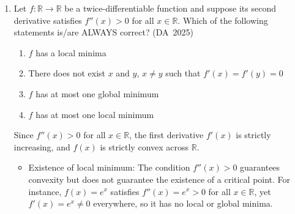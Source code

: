\begin{enumerate}[label=\thesubsection.\arabic*, ref=\thesubsection.\theenumi]
Specifically:
\begin{itemize}
	\item For any $\vec{x}_k$ ($k \in \{1, \dots, 5\}$):
	\begin{align}
		\vec{A}\vec{x}_k = \sum_{i=1}^5 \vec{x}_i \brak{\vec{x}_i^{\top}\vec{x}_k} = \vec{x}_k \brak{1} = 1\cdot\vec{x}_k \implies \lambda = 1 \quad (\text{multiplicity } 5)
	\end{align}
	\item For any orthogonal vector $\vec{y} \perp \text{span}\cbrak{\vec{x}_1, \dots, \vec{x}_5}$:
	\begin{align}
		\vec{A}\vec{y} = \sum_{i=1}^5 \vec{x}_i \brak{\vec{x}_i^{\top}\vec{y}} = \vec{0} = 0\cdot\vec{y} \implies \lambda = 0 \quad (\text{multiplicity } 5)
	\end{align}
\end{itemize}
Since $\vec{A}$ is real, symmetric, and positive semi-definite ($\lambda_i \ge 0$), its singular values $\sigma_i$ are identical to its eigenvalues:
\begin{align}
	\sigma_i = \abs{\lambda_i} = \lambda_i \implies \sigma_i \in \{0, 1\}
\end{align}
The determinant is given by the product of all 10 eigenvalues:
\begin{align}
	\mydet{\vec{A}} = \prod_{i=1}^{10} \lambda_i = 1^5 \times 0^5 = 0
\end{align}
Since $\mydet{\vec{A}} = 0$, $\vec{A}$ is non-invertible.
\\
The following code verifies the solution
\begin{lstlisting}[frame=single, basicstyle=\rmfamily, escapeinside={(*@}{@*)}]
(*@\makebox[\dimexpr\linewidth-2\fboxsep-2\fboxrule\relax][c]{codes/q31/q31.py}@*)
\end{lstlisting}
	
\item 
Let $f : \mathbb{R} \to \mathbb{R}$ be a twice-differentiable function and suppose its second derivative satisfies $f'' (x) > 0$ for all $x \in \mathbb{R}$. Which of the following statements is/are ALWAYS correct?
\hfill (DA~2025)
\begin{enumerate}
	\item $f$ has a local minima
	\item There does not exist $x$ and $y$, $x \neq y$ such that $f' (x) = f' (y) = 0$
	\item $f$ has at most one global minimum
	\item $f$ has at most one local minimum
\end{enumerate}
\solution
Since $f''(x) > 0$ for all $x \in \mathbb{R}$, the first derivative $f'(x)$ is strictly increasing, and $f(x)$ is strictly convex across $\mathbb{R}$.
\begin{itemize}
	\item Existence of local minimum: The condition $f''(x) > 0$ guarantees convexity but does not guarantee the existence of a critical point. For instance, $f(x) = e^x$ satisfies $f''(x) = e^x > 0$ for all $x \in \mathbb{R}$, yet $f'(x) = e^x \neq 0$ everywhere, so it has no local or global minima. 
	

\end{itemize}
\end{enumerate}
